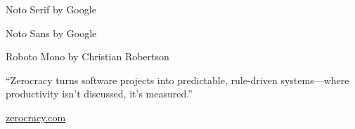 \documentclass{article}
\newcommand\slide[1]{%
  \pagebreak\topskip0pt\vspace*{\fill}%
  \begin{center}\LARGE%
  #1
  \end{center}%
  \vspace*{\fill}}
\begin{document}
\slide{
  \par
  {\Huge\begin{multicols}{3}
  {\rmfamily Noto Serif by Google}
  \par\columnbreak\par
  {\sffamily Noto Sans by Google}
  \par\columnbreak\par
  {\ttfamily Roboto Mono by Christian Robertson}
  \end{multicols}\par}}

\slide{
  \par
  {\Huge\enquote{Zerocracy turns software projects into predictable, rule-driven systems---where productivity isn't discussed, it's measured.}\par}}

\slide{\href{https://www.zerocracy.com}{zerocracy.com}}
\end{document}

